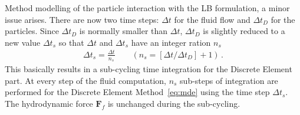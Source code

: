Method modelling of the particle interaction with the LB formulation, a minor 
issue arises. There are now two time steps: $\Delta t$ for the fluid flow and 
$\Delta t_{D}$ for the particles. Since $\Delta t_{D}$ is normally smaller than 
$\Delta t$, $\Delta t_{D}$ is slightly reduced to a new value $\Delta t_{s}$ so 
that $\Delta t$ and $\Delta t_{s}$ have an integer ration 
$\mathit{n}_{\mathit{s}}$
%
\begin{align}
\Delta t_{s}=\frac{\Delta t}{\mathit{n}_{s}} \qquad(\mathit{n}_{s}=[\Delta t/ 
\Delta t_{D}]+1) \,.
\end{align} 
%
This basically results in a sub-cycling time integration for the Discrete 
Element part. At every step of the fluid computation, $\mathit{n}_{s}$ 
sub-steps of integration are performed for the Discrete Element 
Method~\eqref{eq:mde} using the time step $\Delta t_{s}$. The hydrodynamic 
force $\mathbf{F}_{f}$ is unchanged during the sub-cycling. 
%
